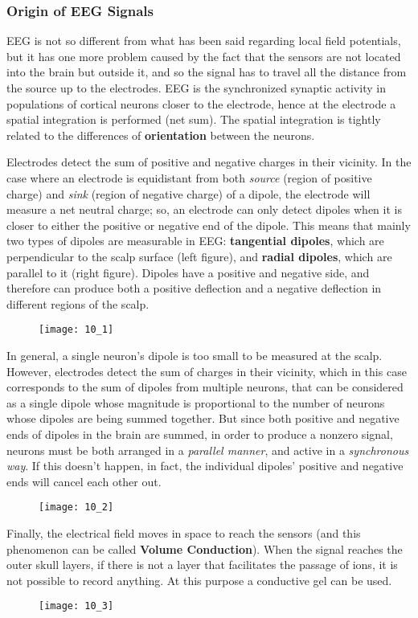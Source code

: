 \subsubsection{Origin of EEG Signals}
EEG is not so different from what has been said regarding local field potentials, but it has one more 
problem caused by the fact that the sensors are not located into the brain but outside it, and so the signal has to travel all the distance 
from the source up to the electrodes. EEG is the synchronized synaptic activity in populations of cortical neurons 
closer to the electrode, hence at the electrode a spatial integration is performed (net sum). 
The spatial integration is tightly related to the differences of \textbf{orientation} between the neurons.
\par\medskip
Electrodes detect the sum of positive and negative charges in their vicinity. In the case where an electrode is 
equidistant from both \textit{source} (region of positive charge) and \textit{sink} (region of negative charge) 
of a dipole, the electrode will measure a net neutral charge; so, an electrode can only detect dipoles when it is  
closer to either the positive or negative end of the dipole. This means that mainly two types of dipoles are 
measurable in EEG: \textbf{tangential dipoles}, which are perpendicular to the scalp surface (left figure), and \textbf{radial
dipoles}, which are parallel to it (right figure). Dipoles have a positive and negative side, 
and therefore can produce both a positive deflection and a negative deflection in different regions of the scalp.
\begin{figure}[H]
    \texttt{[image: 10\_1]}
    \centering
\end{figure}
In general, a single neuron's dipole is too small to be measured at the scalp. However, electrodes detect the 
sum of charges in their vicinity, which in this case corresponds to the sum of dipoles from multiple neurons, that can be considered as a single dipole whose magnitude is proportional to the number of neurons whose 
dipoles are being summed together. But since both positive and negative 
ends of dipoles in the brain are summed, in order to produce a nonzero signal, neurons must be both arranged in a 
\textit{parallel manner}, and active in a \textit{synchronous way}. If this doesn't happen, in fact, the individual dipoles' positive and negative ends will cancel each other out.
\begin{figure}[H]
    \texttt{[image: 10\_2]}
    \centering
\end{figure}
Finally, the electrical field moves in space to reach the sensors (and this phenomenon can 
be called \textbf{Volume Conduction}). When the signal reaches the outer skull layers, if there is not a layer 
that facilitates the passage of ions, it is not possible to record anything. At this purpose a conductive gel can 
be used.
\begin{figure}[H]
    \texttt{[image: 10\_3]}
    \centering
\end{figure}

